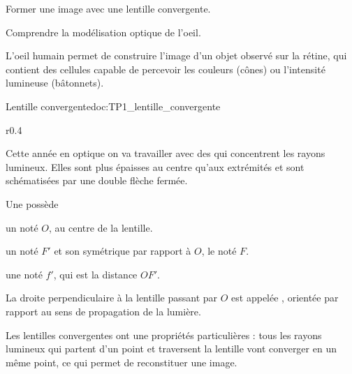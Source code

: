 \teteSndLumi
\vspace*{-24pt}



\vspace*{-4pt}
\begin{objectifs}
  \item Former une image avec une lentille convergente.
  \item Comprendre la modélisation optique de l'oeil.
\end{objectifs}

\begin{contexte}
  L'oeil humain permet de construire l'image d'un objet observé sur la rétine, qui contient des cellules capable de percevoir les couleurs (cônes) ou l'intensité lumineuse (bâtonnets).
  
\end{contexte}


\begin{doc}{Lentille convergente}{doc:TP1_lentille_convergente}
  \begin{wrapfigure}[4]{r}{0.4\linewidth}
    \centering
    \vspace*{-42pt}
  \end{wrapfigure}
  
  Cette année en optique on va travailler avec des  qui concentrent les rayons lumineux.
  Elles sont plus épaisses au centre qu'aux extrémités et sont schématisées par une double flèche fermée.

  \begin{encart}
    Une  possède
    \begin{listePoints}
      \item un  noté $O$, au centre de la lentille. 
      \item un  noté $F'$ et son symétrique par rapport à $O$, le  noté $F$.
      \item une  noté $f'$, qui est la distance $OF'$.
    \end{listePoints}
    
    La droite perpendiculaire à la lentille passant par $O$ est appelée , orientée par rapport au sens de propagation de la lumière.
  \end{encart}

  Les lentilles convergentes ont une propriétés particulières : tous les rayons lumineux qui partent d'un point et traversent la lentille vont converger en un même point, ce qui permet de reconstituer une image.
\end{doc}


